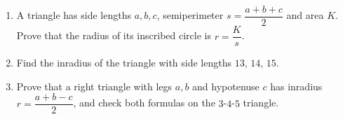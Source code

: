\begin{enumerate}
\item[(a)] A triangle has side lengths $a,b,c$, semiperimeter $s=\dfrac{a+b+c}{2}$ and area $K$. Prove that the radius of its inscribed circle is $r=\dfrac Ks$.
\item[(b)] Find the inradius of the triangle with side lengths $13$, $14$, $15$.
\item[(c)] Prove that a right triangle with legs $a,b$ and hypotenuse $c$ has inradius $r=\dfrac{a+b-c}{2}$, and check both formulas on the $3$-$4$-$5$ triangle.
\end{enumerate}
